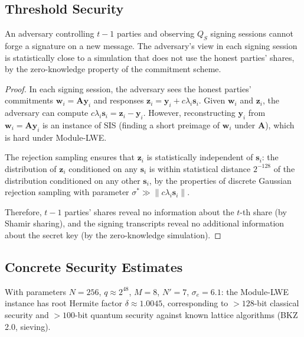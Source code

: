 \subsection{Threshold Security}

\begin{lemma}
\label{lem:threshold}
An adversary controlling $t-1$ parties and observing $Q_S$ signing sessions cannot
forge a signature on a new message. The adversary's view in each signing session
is statistically close to a simulation that does not use the honest parties' shares,
by the zero-knowledge property of the commitment scheme.
\end{lemma}

\begin{proof}
In each signing session, the adversary sees the honest parties' commitments
$\mathbf{w}_i = \mathbf{A}\mathbf{y}_i$ and responses $\mathbf{z}_i = \mathbf{y}_i + c \lambda_i \mathbf{s}_i$.
Given $\mathbf{w}_i$ and $\mathbf{z}_i$, the adversary can compute $c \lambda_i \mathbf{s}_i = \mathbf{z}_i - \mathbf{y}_i$.
However, reconstructing $\mathbf{y}_i$ from $\mathbf{w}_i = \mathbf{A}\mathbf{y}_i$ is
an instance of SIS (finding a short preimage of $\mathbf{w}_i$ under $\mathbf{A}$), which
is hard under Module-LWE.

The rejection sampling ensures that $\mathbf{z}_i$ is statistically independent of
$\mathbf{s}_i$: the distribution of $\mathbf{z}_i$ conditioned on any $\mathbf{s}_i$
is within statistical distance $2^{-128}$ of the distribution conditioned on any other
$\mathbf{s}_i$, by the properties of discrete Gaussian rejection sampling with parameter
$\sigma^* \gg \|c \lambda_i \mathbf{s}_i\|$.

Therefore, $t-1$ parties' shares reveal no information about the $t$-th share (by Shamir
sharing), and the signing transcripts reveal no additional information about the secret
key (by the zero-knowledge simulation).
\end{proof}

\subsection{Concrete Security Estimates}

\begin{proposition}
\label{prop:security-level}
With parameters $N = 256$, $q \approx 2^{48}$, $M = 8$, $N' = 7$, $\sigma_e = 6.1$:
the Module-LWE instance has root Hermite factor $\delta \approx 1.0045$, corresponding
to $> 128$-bit classical security and $> 100$-bit quantum security against known
lattice algorithms (BKZ 2.0, sieving).
\end{proposition}

